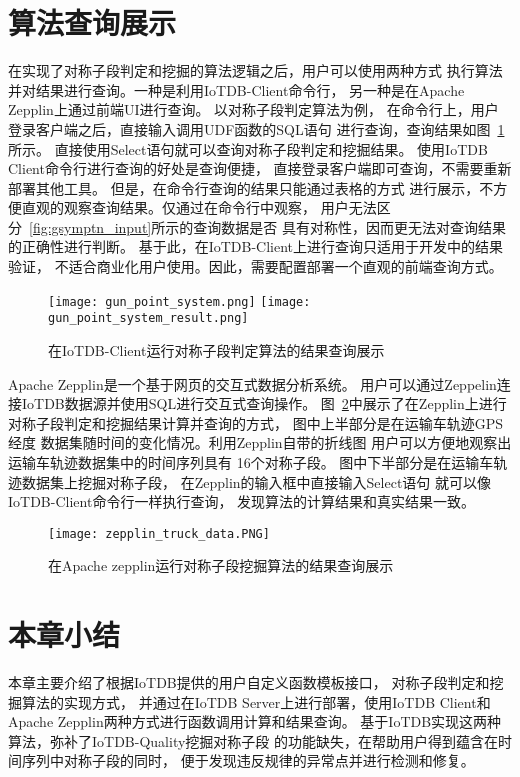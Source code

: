 \section{算法查询展示}

在实现了对称子段判定和挖掘的算法逻辑之后，用户可以使用两种方式
执行算法并对结果进行查询。一种是利用IoTDB-Client命令行，
另一种是在Apache Zepplin上通过前端UI进行查询。
以对称子段判定算法为例，
在命令行上，用户登录客户端之后，直接输入调用UDF函数的SQL语句
进行查询，查询结果如图~\ref{fig:iotdb_client_symptn}所示。
直接使用Select语句就可以查询对称子段判定和挖掘结果。
使用IoTDB Client命令行进行查询的好处是查询便捷，
直接登录客户端即可查询，不需要重新部署其他工具。
但是，在命令行查询的结果只能通过表格的方式
进行展示，不方便直观的观察查询结果。仅通过在命令行中观察，
用户无法区分~\ref{fig:gsymptn_input}所示的查询数据是否
具有对称性，因而更无法对查询结果的正确性进行判断。
基于此，在IoTDB-Client上进行查询只适用于开发中的结果验证，
不适合商业化用户使用。因此，需要配置部署一个直观的前端查询方式。
\begin{figure}
    \centering
    {\texttt{[image: gun\_point\_system.png]}}
    {\texttt{[image: gun\_point\_system\_result.png]}}
    \caption{在IoTDB-Client运行对称子段判定算法的结果查询展示}
    \label{fig:iotdb_client_symptn}
\end{figure}

Apache Zepplin是一个基于网页的交互式数据分析系统。
用户可以通过Zeppelin连接IoTDB数据源并使用SQL进行交互式查询操作。
图~\ref{fig:iotdb_zepplin_symptn}中展示了在Zepplin上进行
对称子段判定和挖掘结果计算并查询的方式，
图中上半部分是在运输车轨迹GPS经度
数据集随时间的变化情况。利用Zepplin自带的折线图
用户可以方便地观察出运输车轨迹数据集中的时间序列具有
16个对称子段。
图中下半部分是在运输车轨迹数据集上挖掘对称子段，
在Zepplin的输入框中直接输入Select语句
就可以像IoTDB-Client命令行一样执行查询，
发现算法的计算结果和真实结果一致。
\begin{figure}
    \centering
    \texttt{[image: zepplin\_truck\_data.PNG]}
    \caption{在Apache zepplin运行对称子段挖掘算法的结果查询展示}
    \label{fig:iotdb_zepplin_symptn}
\end{figure}


\section{本章小结}
本章主要介绍了根据IoTDB提供的用户自定义函数模板接口，
对称子段判定和挖掘算法的实现方式，
并通过在IoTDB Server上进行部署，使用IoTDB Client和
Apache Zepplin两种方式进行函数调用计算和结果查询。
基于IoTDB实现这两种算法，弥补了IoTDB-Quality挖掘对称子段
的功能缺失，在帮助用户得到蕴含在时间序列中对称子段的同时，
便于发现违反规律的异常点并进行检测和修复。